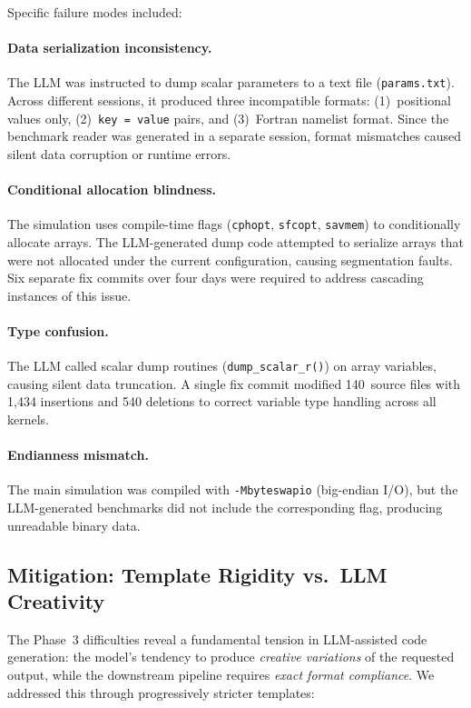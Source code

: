 \documentclass[conference]{IEEEtran}
\begin{document}
Specific failure modes included:

\paragraph{Data serialization inconsistency.}
The LLM was instructed to dump scalar parameters to a text file
(\texttt{params.txt}). Across different sessions, it produced three
incompatible formats: (1)~positional values only, (2)~\texttt{key = value}
pairs, and (3)~Fortran namelist format. Since the benchmark reader was
generated in a separate session, format mismatches caused silent data
corruption or runtime errors.

\paragraph{Conditional allocation blindness.}
The simulation uses compile-time flags (\texttt{cphopt}, \texttt{sfcopt},
\texttt{savmem}) to conditionally allocate arrays. The LLM-generated dump
code attempted to serialize arrays that were not allocated under the current
configuration, causing segmentation faults. Six separate fix commits over
four days were required to address cascading instances of this issue.

\paragraph{Type confusion.}
The LLM called scalar dump routines (\texttt{dump\_scalar\_r()}) on array
variables, causing silent data truncation. A single fix commit modified
140~source files with 1,434 insertions and 540 deletions to correct
variable type handling across all kernels.

\paragraph{Endianness mismatch.}
The main simulation was compiled with \texttt{-Mbyteswapio} (big-endian I/O),
but the LLM-generated benchmarks did not include the corresponding flag,
producing unreadable binary data.

\subsection{Mitigation: Template Rigidity vs.\ LLM Creativity}

The Phase~3 difficulties reveal a fundamental tension in LLM-assisted code
generation: the model's tendency to produce \emph{creative variations} of
the requested output, while the downstream pipeline requires \emph{exact
format compliance}. We addressed this through progressively stricter
templates:
\end{document}
